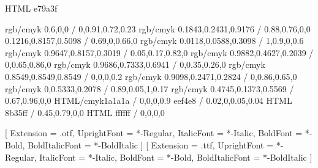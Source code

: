 


\graphicspath{ {./graphics/pictures/} } %




\geometry{a4paper,tmargin=20mm,rmargin=25mm,lmargin=25mm,margin=21mm,bmargin=20mm,footskip=5mm}

\selectcolormodel{\targetcolourmodel}

\definecolor{honey}  {HTML}     {e79a3f}

\definecolor{dtured}     {rgb/cmyk} {0.6,0,0 / 0,0.91,0.72,0.23}
\definecolor{blue}       {rgb/cmyk} {0.1843,0.2431,0.9176 / 0.88,0.76,0,0}
\definecolor{brightgreen}{rgb/cmyk} {0.1216,0.8157,0.5098 / 0.69,0,0.66,0}
\definecolor{navyblue}   {rgb/cmyk} {0.0118,0.0588,0.3098 / 1,0.9,0,0.6}
\definecolor{yellow}     {rgb/cmyk} {0.9647,0.8157,0.3019 / 0.05,0.17,0.82,0}
\definecolor{orange}     {rgb/cmyk} {0.9882,0.4627,0.2039 / 0,0.65,0.86,0}
\definecolor{pink}       {rgb/cmyk} {0.9686,0.7333,0.6941 / 0,0.35,0.26,0}
\definecolor{grey}       {rgb/cmyk} {0.8549,0.8549,0.8549 / 0,0,0,0.2}
\definecolor{red}        {rgb/cmyk} {0.9098,0.2471,0.2824 / 0,0.86,0.65,0}
\definecolor{green}      {rgb/cmyk} {0,0.5333,0.2078 / 0.89,0.05,1,0.17}
\definecolor{purple}     {rgb/cmyk} {0.4745,0.1373,0.5569 / 0.67,0.96,0,0}
\definecolor{TECblack}   {HTML/cmyk}{1a1a1a / 0,0,0,0.9}
\definecolor{TECoffwhite}{HTML}     {eef4e8 / 0.02,0,0.05,0.04}
\definecolor{TECviolet}  {HTML}     {8b35ff / 0.45,0.79,0,0}
\definecolor{TECwhite}   {HTML}     {ffffff / 0,0,0,0}

\setmainfont{STIXTwoText}[
	Extension = .otf,
	UprightFont = *-Regular,
	ItalicFont = *-Italic,
	BoldFont = *-Bold,
	BoldItalicFont = *-BoldItalic
]
\setmonofont{CourierPrime}[
	Extension = .ttf,
	UprightFont = *-Regular,
	ItalicFont = *-Italic,
	BoldFont = *-Bold,
	BoldItalicFont = *-BoldItalic
]

